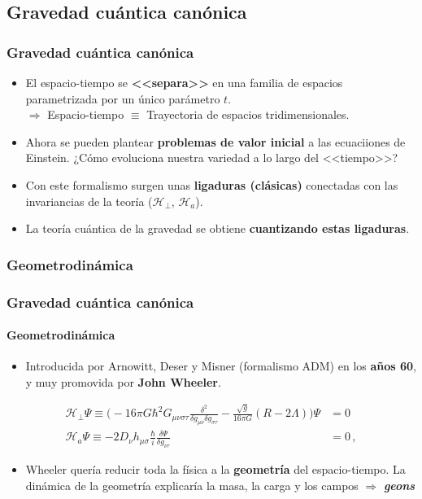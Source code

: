 \documentclass{beamer}
\begin{document}
\subsection{Gravedad cuántica canónica}
\begin{frame}
\frametitle{Gravedad cuántica canónica}
\begin{itemize}
 \item El espacio-tiempo se \textbf{<<separa>>} en una familia de espacios parametrizada por un único parámetro $t$. \\$\Rightarrow$ Espacio-tiempo $\equiv$ Trayectoria de espacios tridimensionales.
 \item Ahora se pueden plantear \textbf{problemas de valor inicial} a las ecuaciiones de Einstein. ¿Cómo evoluciona nuestra variedad a lo largo del <<tiempo>>?
 \item Con este formalismo surgen unas \textbf{ligaduras (clásicas)} conectadas con las invariancias de la teoría ($\mathscr{H}_\perp$, $\mathscr{H}_a$).
 \item La teoría cuántica de la gravedad se obtiene \textbf{cuantizando estas ligaduras}.
\end{itemize}
\end{frame}


\subsubsection{Geometrodinámica}
\begin{frame}
\frametitle{Gravedad cuántica canónica}
\framesubtitle{Geometrodinámica}
\begin{itemize}
 \item Introducida por Arnowitt, Deser y Misner (formalismo ADM) en los \textbf{años 60}, y muy promovida por \textbf{John Wheeler}.
\end{itemize}
\begin{align*}
  \mathscr{H}_\perp\Psi\equiv\Big(-16\pi G\hbar^2G_{\mu\nu\sigma\tau}\frac{\delta^2}{\delta g_{\mu\nu}\delta g_{\sigma\tau}}-\frac{\sqrt{g}}{16\pi G}(R-2\Lambda)\Big)\Psi&=0\\
 \mathscr{H}_a\Psi\equiv-2D_\nu h_{\mu\sigma}\frac{\hbar}{i}\frac{\delta\Psi}{\delta g_{\nu\tau}}&=0\,,
\end{align*}
\begin{itemize}
 \item Wheeler quería reducir toda la física a la \textbf{geometría} del espacio-tiempo. La dinámica de la geometría explicaría la masa, la carga y los campos $\Rightarrow$ \emph{\textbf{geons}}
\end{itemize}
\end{frame}
\end{document}
